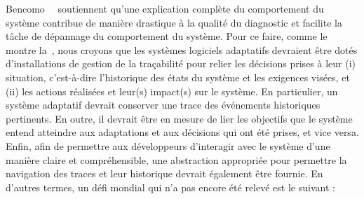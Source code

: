 Bencomo~\etal~\cite{DBLP:conf/iceccs/BencomoWSW12} soutiennent qu'une explication complète du comportement du système contribue de manière drastique à la qualité du diagnostic et facilite la tâche de dépannage du comportement du système. Pour ce faire, comme le montre la~, nous croyons que les systèmes logiciels adaptatifs devraient être dotés d'installations de gestion de la traçabilité pour relier les décisions prises à leur (i) situation, c'est-à-dire l'historique des états du système et les exigences visées, et (ii) les actions réalisées et leur(s) impact(s) sur le système. 
En particulier, un système adaptatif devrait conserver une trace des événements historiques pertinents. 
En outre, il devrait être en mesure de lier les objectifs que le système entend atteindre aux adaptations et aux décisions qui ont été prises, et vice versa. 
Enfin, afin de permettre aux développeurs d'interagir avec le système d'une manière claire et compréhensible, une abstraction appropriée pour permettre la navigation des traces et leur historique devrait également être fournie. 
En d'autres termes, un défi mondial qui n'a pas encore été relevé est le suivant :
\vspace{-2em}

